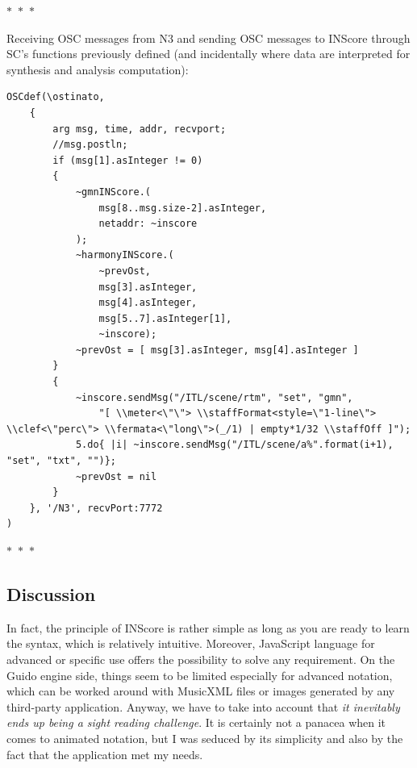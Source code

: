 \documentclass{article}
\begin{document}
\begin{center}
  $\ast$~$\ast$~$\ast$
\end{center}

\noindent Receiving OSC messages from N3 and sending OSC messages to INScore through SC's functions previously defined (and incidentally where data are interpreted for synthesis and analysis computation):
\begin{lstlisting}[style=SuperCollider-IDE]
OSCdef(\ostinato,
    {
        arg msg, time, addr, recvport;
        //msg.postln;
        if (msg[1].asInteger != 0)
        {
            ~gmnINScore.(
                msg[8..msg.size-2].asInteger,
                netaddr: ~inscore
            );
            ~harmonyINScore.(
                ~prevOst,
                msg[3].asInteger,
                msg[4].asInteger,
                msg[5..7].asInteger[1],
                ~inscore);
            ~prevOst = [ msg[3].asInteger, msg[4].asInteger ]
        }
        {
            ~inscore.sendMsg("/ITL/scene/rtm", "set", "gmn", 
                "[ \\meter<\"\"> \\staffFormat<style=\"1-line\"> \\clef<\"perc\"> \\fermata<\"long\">(_/1) | empty*1/32 \\staffOff ]");
            5.do{ |i| ~inscore.sendMsg("/ITL/scene/a%".format(i+1), "set", "txt", "")};
            ~prevOst = nil
        }
    }, '/N3', recvPort:7772
)
\end{lstlisting}
\begin{center}
  $\ast$~$\ast$~$\ast$
\end{center}

\subsection*{Discussion}


In fact, the principle of INScore is rather simple as long as you are ready to learn the syntax, which is relatively intuitive. Moreover, JavaScript language for advanced or specific use offers the possibility to solve any requirement. On the Guido engine side, things seem to be limited especially for advanced notation, which can be worked around with MusicXML files or images generated by any third-party application. Anyway,  we have to take into account that \textit{it inevitably ends up being a sight reading challenge}.
It is certainly not a panacea when it comes to animated notation, but I was seduced by its simplicity and also by the fact that the application met my needs.
\end{document}
